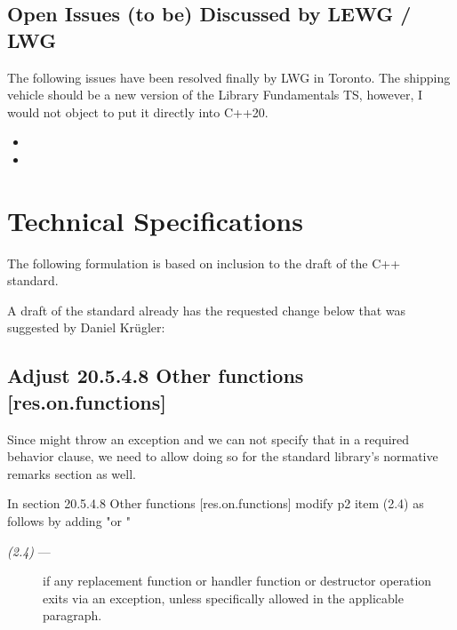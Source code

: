 \documentclass[ebook,11pt,article]{memoir}
\begin{document}
\section{Open Issues (to be) Discussed by LEWG / LWG}
The following issues have been resolved finally by LWG in Toronto. The shipping vehicle should be a new version of the Library Fundamentals TS, however, I would not object to put it directly into C++20.
\begin{itemize}
\item {}
\item {}
\end{itemize}

\newpage
\chapter{Technical Specifications}
The following formulation is based on inclusion to the draft of the C++ standard. 

A draft of the standard already has the requested change below that was suggested by Daniel Kr\"ugler:

\section{Adjust 20.5.4.8 Other functions [res.on.functions]}
Since  might throw an exception and we can not specify that in a required behavior clause, we need to allow doing so for the standard library's normative remarks section as well.

In section 20.5.4.8 Other functions [res.on.functions] modify p2 item (2.4) as follows by adding "or \remarks"

\begin{description}
\item[\textit{(2.4)} ---]
if any replacement function or handler function or destructor operation exits via an exception,
unless specifically allowed
in the applicable
\required {}
paragraph.
\end{description}
\end{document}
